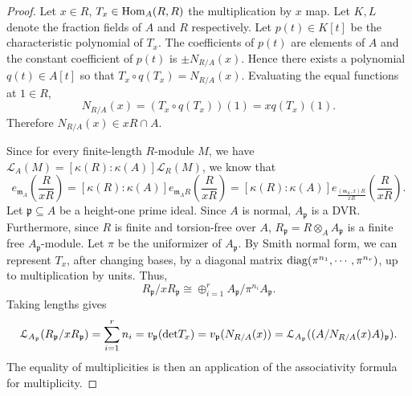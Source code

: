 \documentclass[12pt]{amsart}
\numberwithin{equation}{theorem}
\theoremstyle{plain}
\newcommand{\fm}{\mathfrak{m}}
\begin{document}
\begin{proof}
    Let $x\in R$, $T_x\in \operatorname{Hom}_A(R,R)$ the multiplication by $x$ map. Let $K,L$ denote the fraction fields of $A$ and $R$ respectively. Let $p(t)\in K[t]$ be the characteristic polynomial of $T_x$. The coefficients of $p(t)$ are elements of $A$ and the constant coefficient of $p(t)$ is $\pm N_{R/A}(x)$. Hence there exists a polynomial $q(t)\in A[t]$ so that $T_x\circ q(T_x) = N_{R/A}(x)$. Evaluating the equal functions at $1\in R$, 
    \[
    N_{R/A}(x) = (T_x\circ q(T_x))(1) = xq(T_x)(1).
    \]
    Therefore $N_{R/A}(x)\in xR\cap A$.

    Since for every finite-length $R$-module $M$, we have $\mathcal{L}_A(M)= [\kappa(R):\kappa(A)]\mathcal{L}_R(M)$, we know that 
    \[
        e_{\fm_A}\left(\frac{R}{xR}\right) = [\kappa(R):\kappa(A)] e_{\fm_A R}\left(\frac{R}{x R}\right) = [\kappa(R):\kappa(A)]  e_{\frac{(\fm_A,x)R}{xR}}\left(\frac{R}{x R}\right).
    \]
    Let $\mathfrak p\subseteq A$ be a height-one prime ideal. Since $A$ is normal, $A_{\mathfrak{p}}$ is a DVR. Furthermore, since $R$ is finite and torsion-free over $A$, $R_{\mathfrak{p}} = R \otimes_A A_{\mathfrak{p}}$ is a finite free $A_{\mathfrak{p}}$-module. Let $\pi$ be the uniformizer of $A_{\mathfrak{p}}$. By Smith normal form, we can represent $T_x$, after changing bases, by a diagonal matrix ${\rm diag}(\pi^{n_1},\cdots,\pi^{n_r})$, up to multiplication by units. Thus,
    \[
     R_{\mathfrak{p}}/xR_{\mathfrak{p}} \cong \oplus_{i=1}^{r}A_{\mathfrak{p}}/\pi^{n_i}A_{\mathfrak{p}}.
    \]
    Taking lengths gives
    \[
    \mathcal{L}_{A_{\mathfrak{p}}}(R_{\mathfrak{p}}/xR_{\mathfrak{p}}) = \sum_{i=1}^{r}n_i = v_{\mathfrak{p}}({\rm det}T_x) = v_{\mathfrak{p}}(N_{R/A}(x)) = \mathcal{L}_{A_{\mathfrak{p}}}((A/N_{R/A}(x)A)_{\mathfrak{p}}).
    \]
    The equality of multiplicities is then an application of the associativity formula for multiplicity.
\end{proof}
\end{document}
